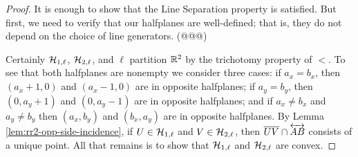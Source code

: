\begin{proof}
It is enough to show that the Line Separation property is satisfied.
But first, we need to verify that our halfplanes are well-defined; that is, they do not depend on the choice of line generators.
(@@@)

Certainly \(\mathcal{H}_{1,\ell}\), \(\mathcal{H}_{2,\ell}\), and \(\ell\) partition \(\mathbb{R}^2\) by the trichotomy property of \(<\).
To see that both halfplanes are nonempty we consider three cases: if \(a_x = b_x\), then \((a_x+1,0)\) and \((a_x-1,0)\) are in opposite halfplanes; if \(a_y = b_y\), then \((0,a_y+1)\) and \((0,a_y-1)\) are in opposite halfplanes; and if \(a_x \neq b_x\) and \(a_y \neq b_y\) then \((a_x,b_y)\) and \((b_x,a_y)\) are in opposite halfplanes. By Lemma \ref{lem:rr2-opp-side-incidence}, if \(U \in \mathcal{H}_{1,\ell}\) and \(V \in \mathcal{H}_{2,\ell}\), then \(\overline{UV} \cap \overleftrightarrow{AB}\) consists of a unique point.
All that remains is to show that \(\mathcal{H}_{1,\ell}\) and \(\mathcal{H}_{2,\ell}\) are convex.


\end{proof}
